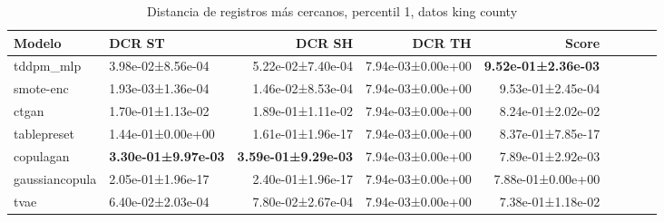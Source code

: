 \begin{table}[H]
\centering
\fontsize{10}{14}\selectfont
\caption{Distancia de registros más cercanos, percentil 1, datos king county}
\label{table-dcr-king county-a}
\begin{tabular}{|l|l|r|r|r|r|r|r|r|}
\hline
\rowcolor[gray]{0.8}
Modelo & DCR ST & DCR SH & DCR TH & \textbf{Score} \\
\hline tddpm\_mlp & 3.98e-02±8.56e-04 & 5.22e-02±7.40e-04 & 7.94e-03±0.00e+00 & \bfseries 9.52e-01±2.36e-03 \\
\hline smote-enc & \cellcolor[rgb]{0.9, 0.54, 0.52} 1.93e-03±1.36e-04 & \cellcolor[rgb]{0.9, 0.54, 0.52} 1.46e-02±8.53e-04 & 7.94e-03±0.00e+00 & 9.53e-01±2.45e-04 \\
\hline ctgan & 1.70e-01±1.13e-02 & 1.89e-01±1.11e-02 & 7.94e-03±0.00e+00 & 8.24e-01±2.02e-02 \\
\hline tablepreset & 1.44e-01±0.00e+00 & 1.61e-01±1.96e-17 & 7.94e-03±0.00e+00 & 8.37e-01±7.85e-17 \\
\hline copulagan & \bfseries 3.30e-01±9.97e-03 & \bfseries 3.59e-01±9.29e-03 & 7.94e-03±0.00e+00 & 7.89e-01±2.92e-03 \\
\hline gaussiancopula & 2.05e-01±1.96e-17 & 2.40e-01±1.96e-17 & 7.94e-03±0.00e+00 & 7.88e-01±0.00e+00 \\
\hline tvae & 6.40e-02±2.03e-04 & 7.80e-02±2.67e-04 & 7.94e-03±0.00e+00 & \cellcolor[rgb]{0.9, 0.54, 0.52} 7.38e-01±1.18e-02 \\
\hline
\end{tabular}
\end{table}
